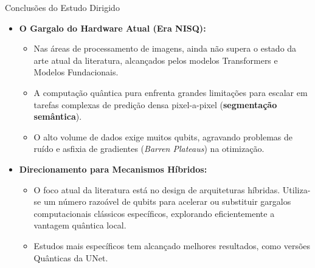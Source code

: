 \documentclass[aspectratio=169, 11pt]{beamer}
\begin{document}
\begin{frame}{Conclusões do Estudo Dirigido}
    \begin{itemize}
        \item \textbf{O Gargalo do Hardware Atual (Era NISQ):}
        \begin{itemize}
            \item Nas áreas de processamento de imagens, ainda não supera o estado da arte atual da literatura, alcançados pelos modelos Transformers e Modelos Fundacionais.
            \item A computação quântica pura enfrenta grandes limitações para escalar em tarefas complexas de predição densa pixel-a-pixel (\textbf{segmentação semântica}).
            \item O alto volume de dados exige muitos qubits, agravando problemas de ruído e asfixia de gradientes (\textit{Barren Plateaus}) na otimização.
        \end{itemize}
        \vfill
        \item \textbf{Direcionamento para Mecanismos Híbridos:}
        \begin{itemize}
            \item O foco atual da literatura está no design de arquiteturas híbridas. Utiliza-se um número razoável de qubits para acelerar ou substituir gargalos computacionais clássicos específicos, explorando eficientemente a vantagem quântica local.
            \item Estudos mais específicos tem alcançado melhores resultados, como versões Quânticas da UNet.
        \end{itemize}
    \end{itemize}
\end{frame}
\end{document}
